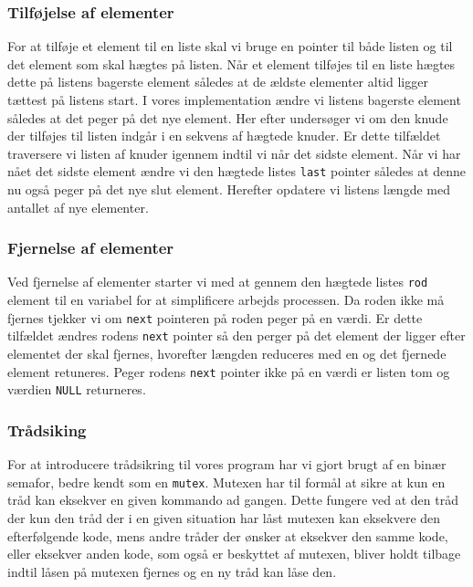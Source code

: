 \documentclass[main.tex]{subfile}
\begin{document}
\subsubsection{Tilføjelse af elementer}
For at tilføje et element til en liste skal vi bruge en pointer til både listen og til det element som skal hægtes på listen. Når et element tilføjes til en liste hægtes dette på listens bagerste element således at de ældste elementer altid ligger tættest på listens start. I vores implementation ændre vi listens bagerste element således at det peger på det nye element. Her efter undersøger vi om den knude der tilføjes til listen indgår i en sekvens af hægtede knuder. Er dette tilfældet traversere vi listen af knuder igennem indtil vi når det sidste element. Når vi har nået det sidste element ændre vi den hægtede listes \texttt{last} pointer således at denne nu også peger på det nye slut element. Herefter opdatere vi listens længde med antallet af nye elementer. 

\subsubsection{Fjernelse af elementer}
Ved fjernelse af elementer starter vi med at gennem den hægtede listes \texttt{rod} element til en variabel for at simplificere arbejds processen. Da roden ikke må fjernes tjekker vi om \texttt{next} pointeren på roden peger på en værdi. Er dette tilfældet ændres rodens \texttt{next} pointer så den perger på det element der ligger efter elementet der skal fjernes, hvorefter længden reduceres med en og det fjernede element retuneres. Peger rodens \texttt{next} pointer ikke på en værdi er listen tom og værdien \texttt{NULL} returneres.

\subsubsection{Trådsiking}
For at introducere trådsikring til vores program har vi gjort brugt af en binær semafor, bedre kendt som en \texttt{mutex}. Mutexen har til formål at sikre at kun en tråd kan eksekver en given kommando ad gangen. Dette fungere ved at den tråd der kun den tråd der i en given situation har låst mutexen kan eksekvere den efterfølgende kode, mens andre tråder der ønsker at eksekver den samme kode, eller eksekver anden kode, som også er beskyttet af mutexen, bliver holdt tilbage indtil låsen på mutexen fjernes og en ny tråd kan låse den.\\
\end{document}
